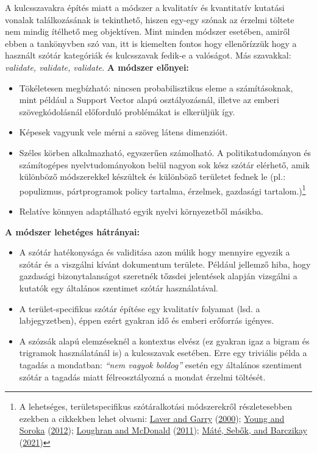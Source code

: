 \documentclass[
]{book}
\providecommand{\tightlist}{%
  \setlength{\itemsep}{0pt}\setlength{\parskip}{0pt}}
\begin{document}
A kulcsszavakra építés miatt a módszer a kvalitatív és kvantitatív
kutatási vonalak találkozásának is tekinthető, hiszen egy-egy szónak az
érzelmi töltete nem mindig ítélhető meg objektíven. Mint minden módszer
esetében, amiről ebben a tankönyvben szó van, itt is kiemelten fontos
hogy ellenőrízzük hogy a használt szótár kategóriák és kulcsszavak
fedik-e a valóságot. Más szavakkal: \emph{validate, validate, validate}.
\textbf{A módszer előnyei:}

\begin{itemize}
\tightlist
\item
  Tökéletesen megbízható: nincsen probabilisztikus eleme a
  számításoknak, mint például a Support Vector alapú osztályozásnál,
  illetve az emberi szövegkódolásnál előforduló problémákat is
  elkerüljük így.
\item
  Képesek vagyunk vele mérni a szöveg látens dimenzióit.
\item
  Széles körben alkalmazható, egyszerűen számolható. A
  politikatudományon és számítogépes nyelvtudományokon belül nagyon sok
  kész szótár elérhető, amik különböző módszerekkel készültek és
  különböző területet fednek le (pl.: populizmus, pártprogramok policy
  tartalma, érzelmek, gazdasági tartalom.)\footnote{A lehetséges,
    területspecifikus szótáralkotási módszerekről részletesebben ezekben
    a cikkekben lehet olvasni:
    \protect\hyperlink{ref-laver2000estimating}{Laver and Garry}
    (\protect\hyperlink{ref-laver2000estimating}{2000});
    \protect\hyperlink{ref-young2012affective}{Young and Soroka}
    (\protect\hyperlink{ref-young2012affective}{2012});
    \protect\hyperlink{ref-loughran2011}{Loughran and McDonald}
    (\protect\hyperlink{ref-loughran2011}{2011});
    \protect\hyperlink{ref-muxe1tuxe92021}{Máté, Sebők, and Barczikay}
    (\protect\hyperlink{ref-muxe1tuxe92021}{2021})}
\item
  Relatíve könnyen adaptálható egyik nyelvi környezetből másikba.
\end{itemize}

\textbf{A módszer lehetéges hátrányai:}

\begin{itemize}
\tightlist
\item
  A szótár hatékonysága és validitása azon múlik hogy mennyire egyezik a
  szótár és a viszgálni kívánt dokumentum területe. Például jellemző
  hiba, hogy gazdasági bizonytalanságot szeretnék tőzsdei jelentések
  alapján vizsgálni a kutatók egy általános szentimet szótár
  használatával.
\item
  A terület-specifikus szótár építése egy kvalitatív folyamat (lsd. a
  labjegyzetben), éppen ezért gyakran idő és emberi erőforrás igényes.
\item
  A szózsák alapú elemzéseknél a kontextus elvész (ez gyakran igaz a
  bigram és trigramok használatánál is) a kulcsszavak esetében. Erre egy
  triviális példa a tagadás a mondatban: \emph{``nem vagyok boldog''}
  esetén egy általános szentiment szótár a tagadás miatt
  félreosztályozná a mondat érzelmi töltését.
\end{itemize}
\end{document}
